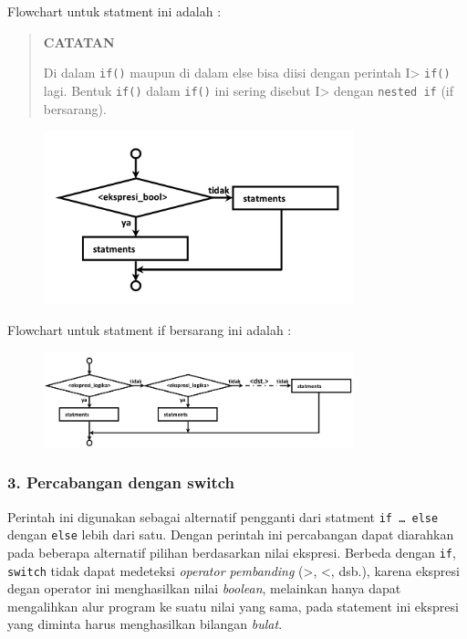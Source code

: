 Flowchart untuk statment ini adalah :

\begin{quotation}
	\textbf{CATATAN} 
	
	Di
	dalam \texttt{if()} maupun di dalam else bisa diisi dengan perintah
	I\textgreater{} \texttt{if()} lagi. Bentuk \texttt{if()} dalam
	\texttt{if()} ini sering disebut I\textgreater{} dengan
	\texttt{nested\ if} (if bersarang).
\end{quotation}


\begin{figure}[htbp]
\centering
\includegraphics[width=0.8\textwidth]{images/capture2-2.png}
\caption{}
\end{figure}

Flowchart untuk statment if bersarang ini adalah :

\begin{figure}[htbp]
\centering
\includegraphics[width=0.8\textwidth]{images/capture2-1.png}
\caption{}
\end{figure}

\subsubsection{3. Percabangan dengan
switch}\label{percabangan-dengan-switch}

Perintah ini digunakan sebagai alternatif pengganti dari statment
\texttt{if\ \ldots{}\ else} dengan \texttt{else} lebih dari satu. Dengan
perintah ini percabangan dapat diarahkan pada beberapa alternatif
pilihan berdasarkan nilai ekspresi. Berbeda dengan \texttt{if},
\texttt{switch} tidak dapat medeteksi \emph{operator pembanding}
(\textgreater{}, \textless{}, dsb.), karena ekspresi degan operator ini
menghasilkan nilai \emph{boolean}, melainkan hanya dapat mengalihkan
alur program ke suatu nilai yang sama, pada statement ini ekspresi yang
diminta harus menghasilkan bilangan \emph{bulat}.

